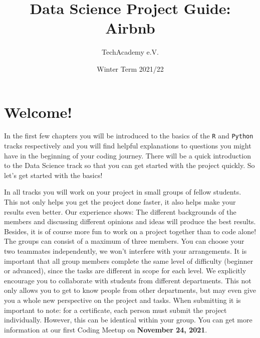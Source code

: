 \documentclass[
  11pt,
]{article}
\title{Data Science Project Guide: Airbnb}
\author{TechAcademy e.V.}
\date{Winter Term 2021/22}
\begin{document}
\maketitle

\clearpage

\addtolength{\headheight}{17.82275pt}

\fancyfoot{}
\fancyfoot[R]{\thepage}
\addtolength{\headheight}{17.82275pt}


\renewcommand{\headrulewidth}{0.25pt}
\renewcommand{\footrulewidth}{0.25pt}

\tableofcontents
\clearpage

\hypertarget{welcome}{%
\section{Welcome!}\label{welcome}}

In the first few chapters you will be introduced to the basics of the \texttt{R} and \texttt{Python} tracks respectively and you will find helpful explanations to questions you might have in the beginning of your coding journey. There will be a quick introduction to the Data Science track so that you can get started with the project quickly. So let's get started with the basics!

In all tracks you will work on your project in small groups of fellow students. This not only helps you get the project done faster, it also helps make your results even better. Our experience shows: The different backgrounds of the members and discussing different opinions and ideas will produce the best results. Besides, it is of course more fun to work on a project together than to code alone!\\
The groups can consist of a maximum of three members. You can choose your two teammates independently, we won't interfere with your arrangements. It is important that all group members complete the same level of difficulty (beginner or advanced), since the tasks are different in scope for each level. We explicitly encourage you to collaborate with students from different departments. This not only allows you to get to know people from other departments, but may even give you a whole new perspective on the project and tasks.
When submitting it is important to note: for a certificate, each person must submit the project individually. However, this can be identical within your group. You can get more information at our first Coding Meetup on \textbf{November 24, 2021}.
\end{document}
